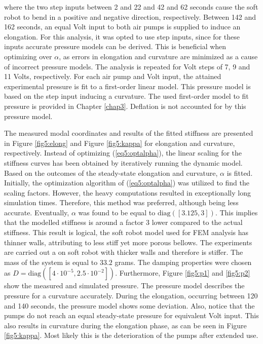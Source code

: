 where the two step inputs between 2 and 22 and 42 and 62 seconds cause the soft robot to bend in a positive and negative direction, respectively. Between 142 and 162 seconds, an equal Volt input to both air pumps is supplied to induce an elongation. For this analysis, it was opted to use step inputs, since for these inputs accurate pressure models can be derived. This is beneficial when optimizing over $\alpha$, as errors in elongation and curvature are minimized as a cause of incorrect pressure models. The analysis is repeated for Volt steps of 7, 9 and 11 Volts, respectively. For each air pump and Volt input, the attained experimental pressure is fit to a first-order linear model. This pressure model is based on the step input inducing a curvature. The used first-order model to fit pressure is provided in Chapter \ref{chap3}. Deflation is not accounted for by this pressure model. 

The measured modal coordinates and results of the fitted stiffness are presented in Figure \ref{fig5:elong} and Figure \ref{fig5:kappa} for elongation and curvature, respectively. Instead of optimizing (\ref{eq5:optalpha}), the linear scaling for the stiffness curves has been obtained by iteratively running the dynamic model. Based on the outcomes of the steady-state elongation and curvature, $\alpha$ is fitted. Initially, the optimization algorithm of (\ref{eq5:optalpha}) was utilized to find the scaling factors. However, the heavy computations resulted in exceptionally long simulation times. Therefore, this method was preferred, although being less accurate. Eventually, $\alpha$ was found to be equal to $\text{diag}([3.125,3])$. This implies that the modelled stiffness is around a factor 3 lower compared to the actual stiffness. This result is logical, the soft robot model used for FEM analysis has thinner walls, attributing to less stiff yet more porous bellows. The experiments are carried out a on soft robot with thicker walls and therefore is stiffer. The mass of the system is equal to $33.2$ grams. The damping properties were chosen as $D = \text{diag}([4\cdot 10^{-5},2.5\cdot 10^{-2}])$. Furthermore, Figure \ref{fig5:p1} and \ref{fig5:p2} show the measured and simulated pressure. The pressure model describes the pressure for a curvature accurately. During the elongation, occurring between 120 and 140 seconds, the pressure model shows some deviation. Also, notice that the pumps do not reach an equal steady-state pressure for equivalent Volt input. This also results in curvature during the elongation phase, as can be seen in Figure \ref{fig5:kappa}. Most likely this is the deterioration of the pumps after extended use. 


